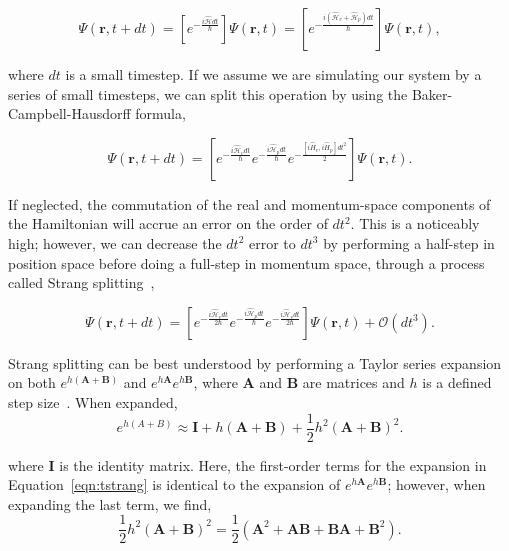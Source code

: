 \begin{equation}
\Psi(\mathbf{r},t + dt) = \left[e^{-\frac{i\mathcal{\hat{H}}dt}{\hbar}}\right]\Psi(\mathbf{r},t) = \left[e^{-\frac{i(\mathcal{\hat{H}}_v + \mathcal{\hat{H}}_p)dt}{\hbar}}\right]\Psi(\mathbf{r},t),
\end{equation}

\noindent where $dt$ is a small timestep.
If we assume we are simulating our system by a series of small timesteps, we can split this operation by using the Baker-Campbell-Hausdorff formula,

\begin{equation}
\Psi(\mathbf{r},t+dt) = \left[e^{-\frac{i\mathcal{\hat{H}}_vdt}{\hbar}}e^{-\frac{i\mathcal{\hat{H}}_pdt}{\hbar}}e^{-\frac{[i\hat{H}_v, i\hat{H}_p]dt^2}{2}}\right]\Psi(\mathbf{r},t).
\label{eqn:rsolve}
\end{equation}

\noindent If neglected, the commutation of the real and momentum-space components of the Hamiltonian will accrue an error on the order of $dt^2$.
This is a noticeably high;
however, we can decrease the $dt^2$ error to $dt^3$ by performing a half-step in position space before doing a full-step in momentum space, through a process called Strang splitting~\cite{strang1968},

\begin{equation}
\Psi(\mathbf{r},t+dt) = \left[e^{-\frac{i\mathcal{\hat{H}}_vdt}{2\hbar}}e^{-\frac{i\mathcal{\hat{H}}_pdt}{\hbar}}e^{-\frac{i\mathcal{\hat{H}}_vdt}{2\hbar}} \right]\Psi(\mathbf{r},t) + \mathcal{O}(dt^3).
\end{equation}

Strang splitting can be best understood by performing a Taylor series expansion on both $e^{h(\mathbf{A}+\mathbf{B})}$ and $e^{h\mathbf{A}}e^{h\mathbf{B}}$, where $\mathbf{A}$ and $\mathbf{B}$ are matrices and $h$ is a defined step size~\cite{macnamara2016}.
When expanded,
\begin{equation}
e^{h(A+B)} \approx \mathbf{I} + h(\mathbf{A} + \mathbf{B}) + \frac{1}{2}h^2(\mathbf{A} + \mathbf{B})^2.
\label{eqn:tstrang}
\end{equation}

\noindent where $\mathbf{I}$ is the identity matrix.
Here, the first-order terms for the expansion in Equation~\eqref{eqn:tstrang} is identical to the expansion of $e^{h\mathbf{A}}e^{h\mathbf{B}}$; however, when expanding the last term, we find,
\begin{equation}
\frac{1}{2}h^2(\mathbf{A} + \mathbf{B})^2 = \frac{1}{2}\left( \mathbf{A}^2 + \mathbf{AB} + \mathbf{BA} + \mathbf{B}^2\right).
\end{equation}


